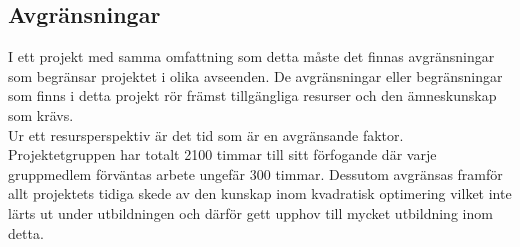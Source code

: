 \subsection{Avgränsningar}
I ett projekt med samma omfattning som detta måste det finnas avgränsningar som begränsar projektet i olika avseenden. De avgränsningar eller begränsningar som finns i detta projekt rör främst tillgängliga resurser och den ämneskunskap som krävs.
\\
Ur ett resursperspektiv är det tid som är en avgränsande faktor. Projektetgruppen har totalt 2100 timmar till sitt förfogande där varje gruppmedlem förväntas arbete ungefär 300 timmar. Dessutom avgränsas framför allt projektets tidiga skede av den kunskap inom kvadratisk optimering vilket inte lärts ut under utbildningen och därför gett upphov till mycket utbildning inom detta.